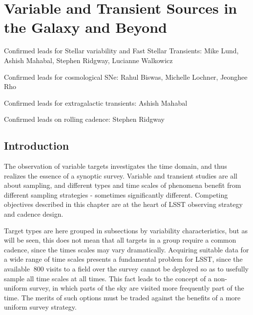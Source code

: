 
\chapter[Variables and Transients]{Variable and Transient Sources in the Galaxy and Beyond}
\def\chpname{vartrans}\label{chp:\chpname}




Confirmed leads for Stellar variability and Fast Stellar Transients:
Mike Lund, Ashish Mahabal, Stephen Ridgway, Lucianne Walkowicz

Confirmed leads for cosmological SNe: Rahul Biswas, Michelle Lochner,
Jeonghee Rho

Confirmed leads for extragalactic transients: Ashish Mahabal

Confirmed leads on rolling cadence: Stephen Ridgway


\section{Introduction}

The observation of variable targets investigates the time domain, and thus realizes the essence of a synoptic survey.  Variable and transient studies are all about sampling, and different types and time scales of phenomena benefit from different sampling strategies - sometimes significantly different.  Competing objectives described in this chapter are at the heart of LSST observing strategy and cadence design.

Target types are here grouped in subsections by variability characteristics, but as will be seen, this does not mean that all targets in a group require a common cadence, since the times scales may vary dramatically.  Acquiring suitable data for a wide range of time scales presents a fundamental problem for LSST, since the available $~$800 visits to a field over the survey cannot be deployed so as to usefully sample all time scales at all times.  This fact leads to the concept of a non-uniform survey, in which parts of the sky are visited more frequently part of the time.  The merits of such options must be traded against the benefits of a more uniform survey strategy.

